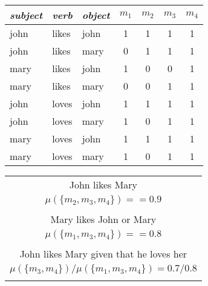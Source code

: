 \documentclass[a4paper,11pt]{article}
\theoremstyle{definition}
\begin{document}
\begin{table*}
  \parbox{.45\linewidth}{
    \centering
    \begin{tabular}{|l|l|l||c|c|c|c|}
      \hline
      \emph{subject} & \emph{verb} & \emph{object} & $m_1$ & $m_2$ & $m_3$ & $m_4$\\
      \hline
      john & likes & john & 1 & 1 & 1 & 1\\
      john & likes & mary & 0 & 1 & 1 & 1\\
      mary & likes & john & 1 & 0 & 0 & 1\\
      mary & likes & mary & 0 & 0 & 1 & 1\\
      john & loves & john & 1 & 1 & 1 & 1\\
      john & loves & mary & 1 & 0 & 1 & 1\\
      mary & loves & john & 1 & 1 & 1 & 1\\
      mary & loves & mary & 1 & 0 & 1 & 1\\
      \hline
    \end{tabular}
    \caption{Four possible models describing relationships between John
      and Mary.}
    \label{table:models}
  }
  \hfill
\parbox{.45\linewidth}{
  \centering
  \begin{tabular}{c}      
    John likes Mary \\ $\mu(\{m_2, m_3, m_4\}) =
    = 0.9$\\
    \mbox{} \\
    Mary likes John or Mary \\ $\mu(\{m_1, m_3, m_4\}) =
    = 0.8$\\
    \mbox{} \\
    John likes Mary given that he loves her\\
    $\mu(\{m_3, m_4\})/\mu(\{m_1, m_3, m_4\}) = 0.7/0.8$\\
    \mbox{}
  \end{tabular}
  \caption{Statements and their probabilities given the models in
    Table \ref{table:models}.}
  \label{table:statements}
}
\end{table*}
\end{document}
